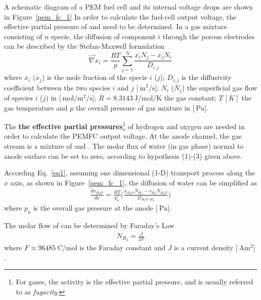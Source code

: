 \documentclass[11pt,a4paper]{article}
\numberwithin{equation}{section}
\theoremstyle{it}
\theoremstyle{definition}
\begin{document}
A schematic diagram of a PEM fuel cell and its internal voltage drops are shown in Figure~\ref{pem_fc_1}
In order to calculate the fuel-cell output voltage, the effective partial pressure of  and  need to be determined. In a gas mixture consisting of $n$ specie, the diffusion of component $i$ through the porous electrodes can be described by the Stefan-Maxwell formulation
\begin{equation}\label{eq1}
	\vec{\nabla}x_i = \frac{RT}{p}\sum_{j=1}^{N}\frac{x_iN_j-x_jN_i}{D_{i,j}}
\end{equation}
where $x_i$ ($x_j$) is the mole fraction of the specie $i$ ($j$); $D_{i,j}$ is the diffusivity coefficient between the two species $i$ and $j$ $\Big[\SI{}{\square\meter\per\second}\Big]$; $N_i$ ($N_j$) the superficial gas flow of species $i$ ($j$) in $\Big[\SI{}{\mole\per\square\meter\per\second}\Big]$; $R=\SI{8.3143}{\joule\per\mole\per\kelvin}$ the gas constant; $T\,[K]$ the gas temperature and $p$ the overall pressure of gas mixture in $\Big[\SI{}{\pascal}\Big]$.

The \textbf{the effective partial pressures}\footnote{For gases, the activity is the effective partial pressure, and is usually referred to as \textit{fugacity}.} of hydrogen and oxygen are needed in order to calculate the PEMFC output voltage. At the anode channel, the gas stream is a mixture of  and . The molar flux of water (in gas phase) normal to anode surface can be set to zero, according to hypothesis (1)-(3) given above.

According Eq.~\eqref{eq1}, assuming one dimensional (1-D) transport process along the $x$ axis, as shown in Figure~\ref{pem_fc_1}, the diffusion of water can be simplified as
\begin{equation}\label{eq2}
	\begin{aligned}
		\frac{dx_{H_2O}}{dx}=\frac{RT}{p_a}\Bigg(\frac{x_{H_2O}N_{H_2}-x_{H_2}N_{H_2O}}{D_{H_2O,H_2}}\Bigg)
	\end{aligned}
\end{equation}
where $p_a$ is the overall gas pressure at the anode $\Big[\SI{}{\pascal}\Big]$.

The molar flow of  can be determined by Faraday's Law
\begin{equation}\label{eq3}
	\begin{aligned}
		N_{H_2}=\frac{J}{2F}
	\end{aligned}
\end{equation}
where $F\approx\SI{96485}{\coulomb\per\mole}$ is the Faraday constant and $J$ is a current density $\Big[\SI{}{\ampere\square\meter}\Big]$.
\end{document}
